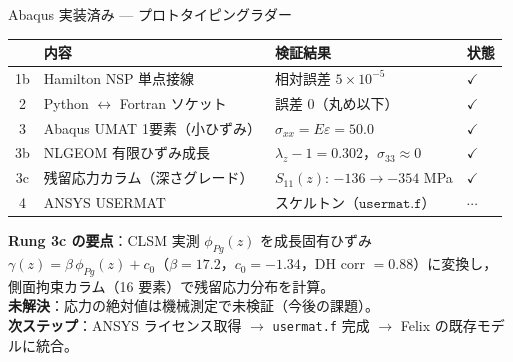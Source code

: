\documentclass[
  ignorenonframetext,
  aspectratio=169,
]{beamer}
\begin{document}
\begin{frame}{Abaqus 実装済み --- プロトタイピングラダー}
\protect\hypertarget{abaqus-ladder}{}

{\small
\begin{tabular}{@{}clll@{}}
\toprule
 & 内容 & 検証結果 & 状態\\
\midrule
1b & Hamilton NSP 単点接線 & 相対誤差 $5\times10^{-5}$ & $\checkmark$\\
2  & Python $\leftrightarrow$ Fortran ソケット & 誤差 0（丸め以下） & $\checkmark$\\
3  & Abaqus UMAT 1要素（小ひずみ） & $\sigma_{xx}=E\varepsilon=50.0$ & $\checkmark$\\
3b & NLGEOM 有限ひずみ成長 & $\lambda_z-1=0.302$，$\sigma_{33}\approx0$ & $\checkmark$\\
3c & 残留応力カラム（深さグレード） & $S_{11}(z)$: $-136\to-354$ MPa & $\checkmark$\\
4  & ANSYS USERMAT & スケルトン（$\texttt{usermat.f}$） & $\cdots$\\
\bottomrule
\end{tabular}
}

\vspace{6pt}
\textbf{Rung 3c の要点}：CLSM 実測 $\phi_{Pg}(z)$ を成長固有ひずみ
$\gamma(z)=\beta\,\phi_{Pg}(z)+c_0$（$\beta=17.2$，$c_0=-1.34$，DH corr $= 0.88$）に変換し，
側面拘束カラム（16 要素）で残留応力分布を計算。\\[4pt]
{\footnotesize
\textbf{未解決}：応力の絶対値は機械測定で未検証（今後の課題）。\\
\textbf{次ステップ}：ANSYS ライセンス取得 $\to$ \texttt{usermat.f} 完成 $\to$ Felix の既存モデルに統合。}
\end{frame}

\end{document}
